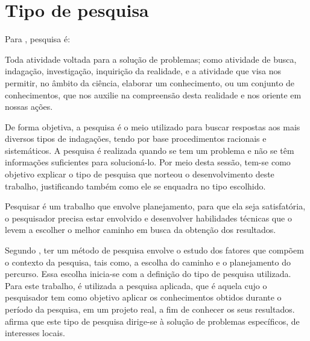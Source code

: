 \section{Tipo de pesquisa}

\par Para , pesquisa é:

\begin{citacao}
	Toda atividade voltada para a solução de problemas; como atividade de busca, indagação, investigação, inquirição da realidade, e a atividade que visa nos permitir, no âmbito da ciência, elaborar um  conhecimento, ou um conjunto de conhecimentos, que nos auxilie na compreensão desta realidade e nos oriente em nossas ações.
\end{citacao}


\par De forma objetiva, a pesquisa é o meio utilizado para buscar respostas aos mais diversos tipos de indagações, tendo por base procedimentos racionais e sistemáticos. A pesquisa é realizada quando se tem um problema e não se têm informações suficientes para solucioná-lo. Por meio desta sessão, tem-se como objetivo explicar o tipo de pesquisa que norteou o desenvolvimento deste trabalho, justificando também como ele se enquadra no tipo escolhido.

\par Pesquisar é um trabalho que envolve planejamento, para que ela seja satisfatória, o pesquisador precisa estar envolvido e  desenvolver habilidades técnicas que o levem a escolher o melhor caminho em busca da obtenção dos resultados.

\par Segundo , ter um método de pesquisa envolve o estudo dos fatores que compõem o contexto da pesquisa, tais como, a escolha do caminho e o planejamento do percurso. Essa escolha inicia-se com a definição do tipo de pesquisa utilizada. Para este trabalho, é utilizada a pesquisa aplicada, que é aquela cujo o pesquisador tem como objetivo aplicar os conhecimentos obtidos durante o período da pesquisa, em um projeto real, a fim de conhecer os seus resultados.  afirma que este tipo de pesquisa dirige-se à solução de problemas específicos, de interesses locais.

